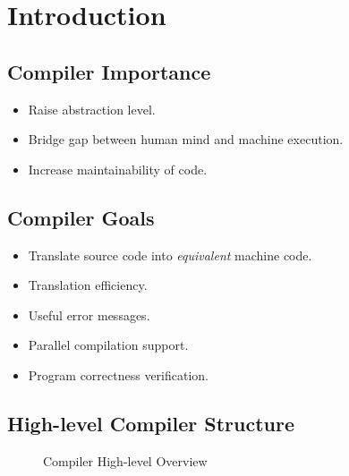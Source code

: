 \section{Introduction}

\subsection{Compiler Importance}
\begin{itemize}
    \item Raise abstraction level.
    \item Bridge gap between human mind and machine execution.
    \item Increase maintainability of code.
\end{itemize}

\subsection{Compiler Goals}
\begin{itemize}
    \item Translate source code into \textit{equivalent} machine code.
    \item Translation efficiency.
    \item Useful error messages.
    \item Parallel compilation support.
    \item Program correctness verification.
\end{itemize}

\subsection{High-level Compiler Structure}
\begin{figure}[H]
    \centering
    \caption{Compiler High-level Overview}
    \label{fig:compiler-high-level-overview}
\end{figure}
